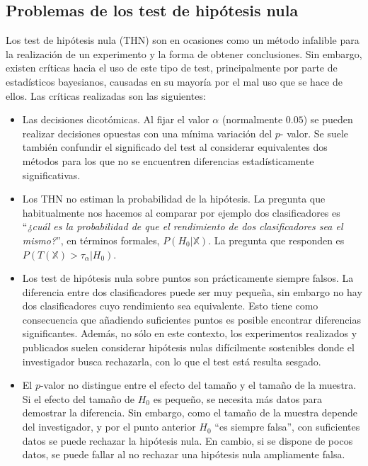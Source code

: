 \subsection{Problemas de los test de hipótesis nula}	

	Los test de hipótesis nula (THN) son en ocasiones como un
método infalible para la realización de un experimento y la
forma de obtener conclusiones. Sin embargo, existen críticas
hacia el uso de este tipo de test, principalmente por parte 
de estadísticos bayesianos, causadas en su mayoría por el mal
uso que se hace de ellos. Las críticas realizadas son las
siguientes:

\begin{itemize}
\item Las decisiones dicotómicas. Al fijar el valor 
	$\alpha$ (normalmente $0.05$) se pueden realizar 
	decisiones opuestas con una mínima variación del $p$-
	valor. Se suele también confundir el significado del 
	test al considerar equivalentes dos métodos para los que
	no se encuentren diferencias estadísticamente 
	significativas.
\item Los THN no estiman la probabilidad
	de la hipótesis. La pregunta que habitualmente nos
	hacemos al comparar por ejemplo dos clasificadores es
	``\textit{¿cuál es la probabilidad de que el rendimiento
	de dos clasificadores sea el mismo?}'', en términos
	formales, $P(H_0 | \mathbb{X})$. La pregunta que
	responden es $P(T(\mathbb{X}) > \tau_\alpha | H_0)$.
\item Los test de hipótesis nula sobre puntos son
	prácticamente siempre falsos. La diferencia entre
	dos clasificadores puede ser muy pequeña, sin embargo
	no hay dos clasificadores cuyo rendimiento sea 
	equivalente. Esto tiene como consecuencia que añadiendo
	suficientes puntos es posible encontrar diferencias
	significantes. Además, no sólo en este contexto, los
	experimentos realizados y publicados suelen considerar
	hipótesis nulas difícilmente sostenibles donde el
	investigador busca rechazarla, con lo que el test está
	resulta sesgado.
\item El $p$-valor no distingue entre el efecto del tamaño
	y el tamaño de la muestra. Si el efecto del tamaño de
	$H_0$ es pequeño, se necesita más datos para demostrar 
	la diferencia. Sin embargo, como el tamaño de la muestra
	depende del investigador, y por el punto anterior $H_0$ 
	``es siempre falsa'', con suficientes datos se puede
	rechazar la hipótesis nula. En cambio, si se dispone 
	de pocos datos, se puede fallar al no rechazar una
	hipótesis nula ampliamente falsa.

\end{itemize}
